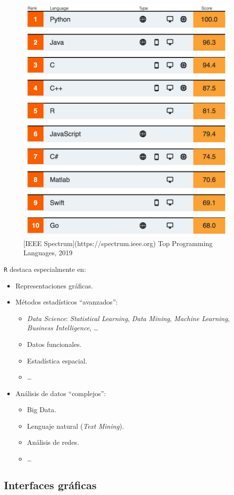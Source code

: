 \documentclass[]{book}
\begin{document}
\begin{figure}[!htb]

{\centering \includegraphics[width=0.35\linewidth]{figuras/IEEE-top-programming-languages-of-2019} 

}

\caption{[IEEE Spectrum](https://spectrum.ieee.org) Top Programming Languages, 2019}\label{fig:ieee}
\end{figure}

\texttt{R} destaca especialmente en:

\begin{itemize}
\item
  Representaciones gráficas.
\item
  Métodos estadísticos ``avanzados'':

  \begin{itemize}
  \item
    \emph{Data Science}: \emph{Statistical Learning}, \emph{Data Mining},
    \emph{Machine Learning}, \emph{Business Intelligence}, \ldots{}
  \item
    Datos funcionales.
  \item
    Estadística espacial.
  \item
    \ldots{}
  \end{itemize}
\item
  Análisis de datos ``complejos'':

  \begin{itemize}
  \item
    Big Data.
  \item
    Lenguaje natural (\emph{Text Mining}).
  \item
    Análisis de redes.
  \item
    \ldots{}
  \end{itemize}
\end{itemize}

\hypertarget{interfaces-graficas}{%
\subsection{Interfaces gráficas}\label{interfaces-graficas}}
\end{document}
